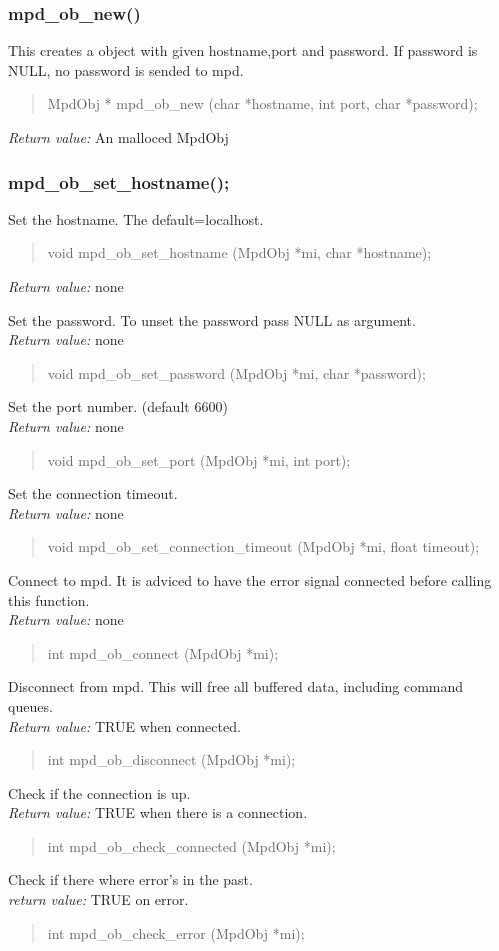 \documentclass[a4paper,11pt]{article}
\begin{document}
\subsubsection{mpd\_ob\_new()}
This creates a object with given hostname,port and password. If password is NULL, no password is sended to mpd.\\
\begin{quote}
MpdObj * mpd\_ob\_new (char *hostname, int port, char *password); 
\end{quote}
\textit{Return value:} An malloced MpdObj
\subsubsection{mpd\_ob\_set\_hostname();}
Set the hostname. The default=localhost.
\begin{quote}
void mpd\_ob\_set\_hostname (MpdObj *mi, char *hostname); 
\end{quote}
\textit{Return value:} none

Set the password. To unset the password pass NULL as argument.\\
\textit{Return value:} none
\begin{quote}
void mpd\_ob\_set\_password (MpdObj *mi, char *password); 
\end{quote}
Set the port number. (default 6600)\\
\textit{Return value:} none
\begin{quote}
void mpd\_ob\_set\_port (MpdObj *mi, int port); 
\end{quote}
Set the connection timeout.\\
\textit{Return value:} none
\begin{quote}
void mpd\_ob\_set\_connection\_timeout (MpdObj *mi, float timeout);
\end{quote}
Connect to mpd. It is adviced to have the error signal connected before calling this function.\\
\textit{Return value:} none
\begin{quote}
int mpd\_ob\_connect (MpdObj *mi); 
\end{quote}
Disconnect from mpd. This will free all buffered data, including command queues.\\
\textit{Return value:} TRUE when connected.
\begin{quote}
int mpd\_ob\_disconnect (MpdObj *mi);
\end{quote}
Check if the connection is up.\\
\textit{Return value:} TRUE when there is a connection.
\begin{quote}
int mpd\_ob\_check\_connected (MpdObj *mi); 
\end{quote}
Check if there where error's in the past.\\
\textit{return value:} TRUE on error.
\begin{quote}
int mpd\_ob\_check\_error (MpdObj *mi);
\end{quote}
\end{document}
